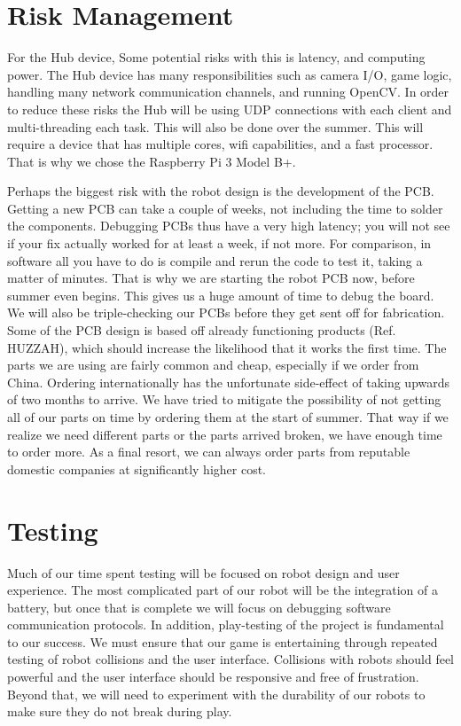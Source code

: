 \documentclass[11pt]{ieeeconf}
\begin{document}
\section{Risk Management}
For the Hub device, Some potential risks with this is latency, and computing power. The Hub device has many responsibilities such as camera I/O, game logic, handling many network communication channels, and running OpenCV. In order to reduce these risks the Hub will be using UDP connections with each client and multi-threading each task. This will also be done over the summer. This will require a device that has multiple cores, wifi capabilities, and a fast processor. That is why we chose the Raspberry Pi 3 Model B+.

Perhaps the biggest risk with the robot design is the development of the PCB. Getting a new PCB can take a couple of weeks, not including the time to solder the components. Debugging PCBs thus have a very high latency; you will not see if your fix actually worked for at least a week, if not more. For comparison, in software all you have to do is compile and rerun the code to test it, taking a matter of minutes. That is why we are starting the robot PCB now, before summer even begins. This gives us a huge amount of time to debug the board. We will also be triple-checking our PCBs before they get sent off for fabrication. Some of the PCB design is based off already functioning products (Ref. HUZZAH), which should increase the likelihood that it works the first time. The parts we are using are fairly common and cheap, especially if we order from China. Ordering internationally has the unfortunate side-effect of taking upwards of two months to arrive. We have tried to mitigate the possibility of not getting all of our parts on time by ordering them at the start of summer. That way if we realize we need different parts or the parts arrived broken, we have enough time to order more. As a final resort, we can always order parts from reputable domestic companies at significantly higher cost.

\section{Testing}
Much of our time spent testing will be focused on robot design and user experience. The most complicated part of our robot will be the integration of a battery, but once that is complete we will focus on debugging software communication protocols. In addition, play-testing of the project is fundamental to our success. We must ensure that our game is entertaining through repeated testing of robot collisions and the user interface. Collisions with robots should feel powerful and the user interface should be responsive and free of frustration. Beyond that, we will need to experiment with the durability of our robots to make sure they do not break during play.
\end{document}
